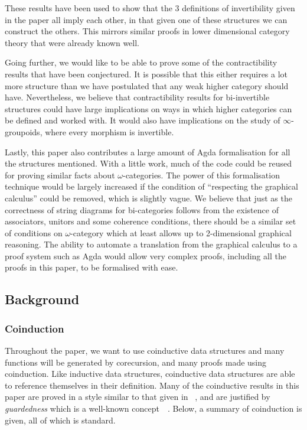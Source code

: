 \documentclass[draft]{article}
\begin{document}
These results have been used to show that the 3 definitions of
invertibility given in the paper all imply each other, in that given
one of these structures we can construct the others. This mirrors
similar proofs in lower dimensional category theory that were already
known well.

Going further, we would like to be able to prove some of the
contractibility results that have been conjectured. It is possible
that this either requires a lot more structure than we have postulated
that any weak higher category should have. Nevertheless, we believe
that contractibility results for bi-invertible structures could have
large implications on ways in which higher categories can be defined
and worked with. It would also have implications on the study of
\(\infty\)-groupoids, where every morphism is invertible.

Lastly, this paper also contributes a large amount of Agda
formalisation for all the structures mentioned. With a little work,
much of the code could be reused for proving similar facts about
\(\omega\)-categories. The power of this formalisation technique would
be largely increased if the condition of ``respecting the graphical
calculus'' could be removed, which is slightly vague. We believe that
just as the correctness of string diagrams for bi-categories follows
from the existence of associators, unitors and some coherence
conditions, there should be a similar set of conditions on
\(\omega\)-category which at least allows up to 2-dimensional
graphical reasoning. The ability to automate a translation from the
graphical calculus to a proof system such as Agda would allow very
complex proofs, including all the proofs in this paper, to be
formalised with ease.

\subsection{Background}\label{sec:background}

\subsubsection{Coinduction}\label{sec:coinduction}

Throughout the paper, we want to use coinductive data structures and
many functions will be generated by corecursion, and many proofs made
using coinduction. Like inductive data structures, coinductive data
structures are able to reference themselves in their definition. Many
of the coinductive results in this paper are proved in a style similar
to that given in ~\cite{kozen_silva_2017},
and are justified by \emph{guardedness} which is a well-known
concept~\cite{10.1007/3-540-58085-9_72}~\cite{gimenez1995codifying}.
Below, a summary of coinduction is given, all of which is standard.
\end{document}
